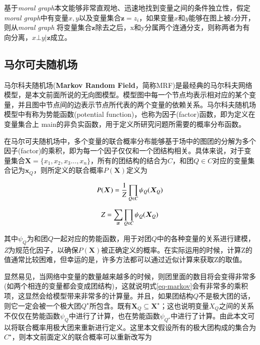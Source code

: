 基于\textit{moral graph}本文能够非常直观地、迅速地找到变量之间的条件独立性，假定\textit{moral graph}中有变量$x, y$以及变量集合$\bm{z} = {z_i}$，如果变量$x$和$y$能够在图上被$z$分开，则从\textit{moral graph} 将变量集合$\bm{z}$除去之后，x和y分属两个连通分支，则称两者为有向分离，$x \bot y | \bm{z}$成立。



\subsection{马尔可夫随机场}

马尔科夫随机场(\textbf{Markov Random Field}，简称MRF)是最经典的马尔科夫网络模型，是本文前面所说的无向图模型。模型图中每一个节点均表示相对应的某个变量，并且图中节点间的边表示节点所代表的两个变量的依赖关系。马尔科夫随机场模型中有称为势能函数(potential function)，也称为因子(factor)函数，即为定义在变量集合上 main的非负实函数，用于定义所研究问题所需要的概率分布函数。

在马尔可夫随机场中，多个变量的联合概率分布能够基于场中的图团的分解为多个因子(factor)的乘积，即为每一个因子仅仅和一个团结构相关。具体来说，对于变量集合$\bm{X} = \{x_1, x_2, x_3..., x_n\}$，所有的团结构的结合为$C$，和团$Q \in C$对应的变量集合记为$\bm{x}_Q$，则所定义的联合概率$P(\bm{X})$定义为

\begin{equation}
	P(\bm{X}) = \frac{1}{Z} \prod_{Q \in C} \psi_Q(\bm{X}_Q) \\
	\label{eq-markov}
\end{equation}

\begin{equation}
Z = \sum_{\bm{x}} \prod_{Q \in C} \psi_Q(\bm{X}_Q) \\
\end{equation}


其中$\psi_Q$为和团$Q$一起对应的势能函数，用于对团$Q$中的各种变量的关系进行建模，\textit{Z}为规范化因子，以确保$P(\bm{X})$被正确定义的概率。在实际运用的时候，计算Z的值通常比较困难，但幸运的是，许多方法都可以通过近似计算来获取Z的取值。

显然易见，当网络中变量的数量越来越多的时候，则团里面的数目将会变得非常多(如两个相连的变量都会变成团结构)，这就说明式\ref{eq-markov}会有非常多的乘积项，这显然会给模型带来非常多的计算量。并且，如果团结构$Q$不是极大团的话，则它一定会被一个极大团$Q^{\star}$所包含。既有$\bm{X}_Q \subseteq \bm{X}^{\star}$；这也说明变量$X_Q$之间的关系不仅仅在势能函数$\psi_Q$中进行了计算，也在势能函数$\psi_{Q^{\star}}$中进行了计算。由此本文可以将联合概率用极大团来重新进行定义。这里本文假设所有的极大团构成的集合为$C^{\star}$，则本文前面定义的联合概率可以重新改写为

